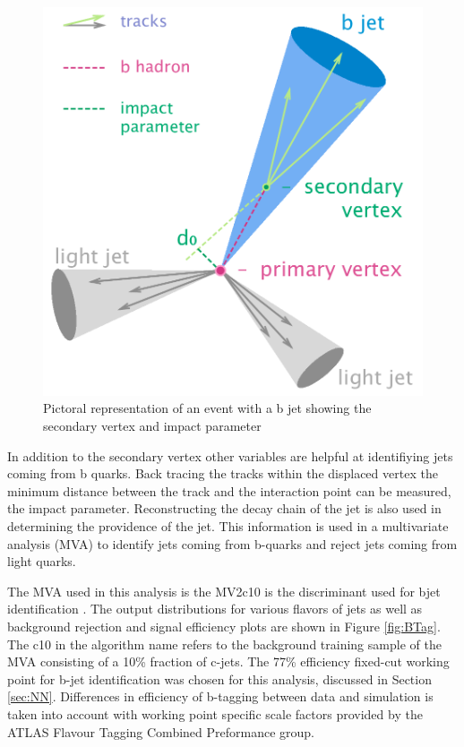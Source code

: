 \begin{figure}[h!]
	\centering
	\includegraphics[width=.5\columnwidth]{../ThesisImages/Simulation/B-tagging_diagram.png}
	\caption[Pictoral representation of an event with a b jet showing the secondary vertex and impact parameter]{Pictoral representation of an event with a b jet showing the secondary vertex and impact parameter \cite{BTagImg} 
	}
	\label{fig:BTagVars}
\end{figure}

In addition to the secondary vertex other variables are helpful at identifiying jets coming from b quarks.  Back tracing the tracks within the displaced vertex the minimum distance between the track and the interaction point can be measured, the impact parameter.  Reconstructing the decay chain of the jet is also used in determining the providence of the jet.  This information is used in a multivariate analysis (MVA) to identify jets coming from b-quarks and reject jets coming from light quarks.

The MVA used in this analysis is the MV2c10 is the discriminant used for bjet identification \cite{BJet1718}.  The output distributions for various flavors of jets as well as background rejection and signal efficiency plots are shown in Figure \ref{fig:BTag}.  The c10 in the algorithm name refers to the background training sample of the MVA consisting of a 10\% fraction of c-jets.  The 77\% efficiency fixed-cut working point for b-jet identification was chosen for this analysis, discussed in Section \ref{sec:NN}.  Differences in efficiency of b-tagging between data and simulation is taken into account with working point specific scale factors provided by the ATLAS Flavour Tagging Combined Preformance group.


